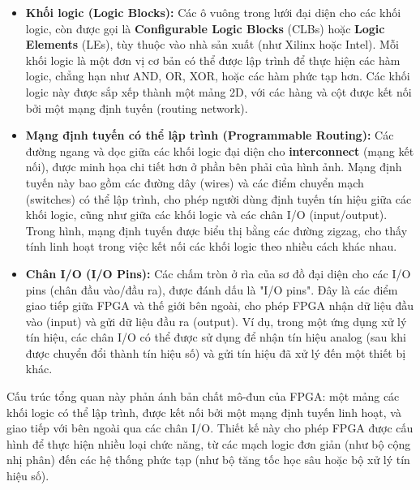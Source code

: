 \documentclass[a4paper]{article}
\begin{document}
\begin{itemize}
    \item \textbf{Khối logic (Logic Blocks):} Các ô vuông trong lưới đại diện cho các khối logic, còn được gọi là \textbf{Configurable Logic Blocks} (CLBs) hoặc \textbf{Logic Elements} (LEs), tùy thuộc vào nhà sản xuất (như Xilinx hoặc Intel). Mỗi khối logic là một đơn vị cơ bản có thể được lập trình để thực hiện các hàm logic, chẳng hạn như AND, OR, XOR, hoặc các hàm phức tạp hơn. Các khối logic này được sắp xếp thành một mảng 2D, với các hàng và cột được kết nối bởi một mạng định tuyến (routing network).
    \item  \textbf{Mạng định tuyến có thể lập trình (Programmable Routing):} Các đường ngang và dọc giữa các khối logic đại diện cho \textbf{interconnect} (mạng kết nối), được minh họa chi tiết hơn ở phần bên phải của hình ảnh. Mạng định tuyến này bao gồm các đường dây (wires) và các điểm chuyển mạch (switches) có thể lập trình, cho phép người dùng định tuyến tín hiệu giữa các khối logic, cũng như giữa các khối logic và các chân I/O (input/output). Trong hình, mạng định tuyến được biểu thị bằng các đường zigzag, cho thấy tính linh hoạt trong việc kết nối các khối logic theo nhiều cách khác nhau.
    \item \textbf{Chân I/O (I/O Pins):} Các chấm tròn ở rìa của sơ đồ đại diện cho các I/O pins (chân đầu vào/đầu ra), được đánh dấu là "I/O pins". Đây là các điểm giao tiếp giữa FPGA và thế giới bên ngoài, cho phép FPGA nhận dữ liệu đầu vào (input) và gửi dữ liệu đầu ra (output). Ví dụ, trong một ứng dụng xử lý tín hiệu, các chân I/O có thể được sử dụng để nhận tín hiệu analog (sau khi được chuyển đổi thành tín hiệu số) và gửi tín hiệu đã xử lý đến một thiết bị khác.

\end{itemize}

Cấu trúc tổng quan này phản ánh bản chất mô-đun của FPGA: một mảng các khối logic có thể lập trình, được kết nối bởi một mạng định tuyến linh hoạt, và giao tiếp với bên ngoài qua các chân I/O. Thiết kế này cho phép FPGA được cấu hình để thực hiện nhiều loại chức năng, từ các mạch logic đơn giản (như bộ cộng nhị phân) đến các hệ thống phức tạp (như bộ tăng tốc học sâu hoặc bộ xử lý tín hiệu số).
\end{document}
